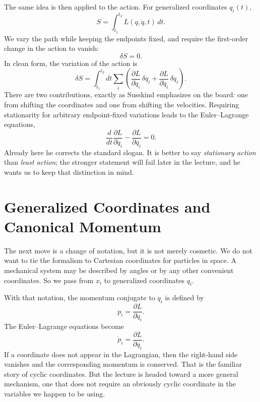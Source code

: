 The same idea is then applied to the action. For generalized coordinates \(q_i(t)\),
\begin{equation}
S=\int_{t_1}^{t_2}L(q,\dot q,t)\,dt.
\end{equation}
We vary the path while keeping the endpoints fixed, and require the first-order change in the action to vanish:
\begin{equation}
\delta S=0.
\end{equation}
In clean form, the variation of the action is
\begin{equation}
\delta S
=
\int_{t_1}^{t_2} dt
\sum_i
\left(
\frac{\partial L}{\partial q_i}\,\delta q_i
+
\frac{\partial L}{\partial \dot q_i}\,\delta \dot q_i
\right).
\end{equation}
There are two contributions, exactly as Susskind emphasizes on the board: one from shifting the coordinates and one from shifting the velocities. Requiring stationarity for arbitrary endpoint-fixed variations leads to the Euler--Lagrange equations,
\begin{equation}
\frac{d}{dt}\frac{\partial L}{\partial \dot q_i}
-
\frac{\partial L}{\partial q_i}
=0.
\end{equation}
Already here he corrects the standard slogan. It is better to say \emph{stationary action} than \emph{least action}; the stronger statement will fail later in the lecture, and he wants us to keep that distinction in mind.

\section{Generalized Coordinates and Canonical Momentum}

The next move is a change of notation, but it is not merely cosmetic. We do not want to tie the formalism to Cartesian coordinates for particles in space. A mechanical system may be described by angles or by any other convenient coordinates. So we pass from \(x_i\) to generalized coordinates \(q_i\).

With that notation, the momentum conjugate to \(q_i\) is defined by
\begin{equation}
p_i=\frac{\partial L}{\partial \dot q_i}.
\end{equation}
The Euler--Lagrange equations become
\begin{equation}
\dot p_i=\frac{\partial L}{\partial q_i}.
\end{equation}
If a coordinate does not appear in the Lagrangian, then the right-hand side vanishes and the corresponding momentum is conserved. That is the familiar story of cyclic coordinates. But the lecture is headed toward a more general mechanism, one that does not require an obviously cyclic coordinate in the variables we happen to be using.

